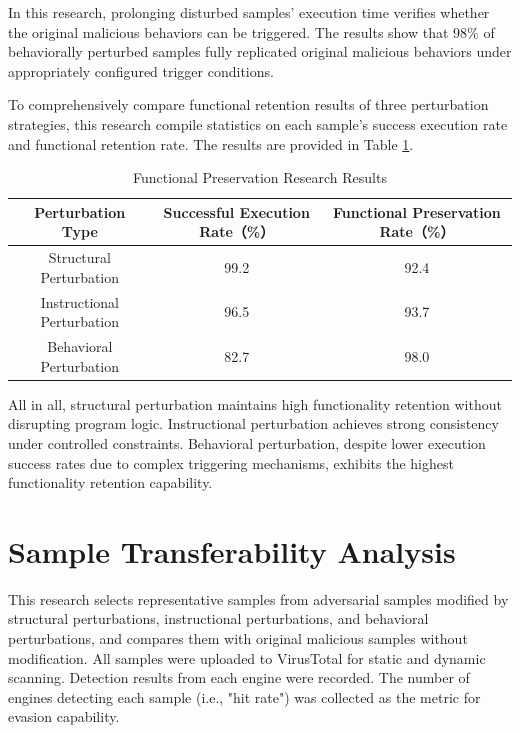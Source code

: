 In this research, prolonging disturbed samples' execution time verifies whether the original malicious behaviors can be triggered. The results show that 98\% of behaviorally perturbed samples fully replicated original malicious behaviors under appropriately configured trigger conditions.

To comprehensively compare functional retention results of three perturbation strategies, this research compile statistics on each sample's success execution rate and functional retention rate. The results are provided in Table \ref{tab:5.12}.

\begin{table}[htb]
	\centering
	\caption{Functional Preservation Research Results}
	\label{tab:5.12}
	\begin{tabular*}{0.9\textwidth}{@{\extracolsep{\fill}}ccc}
		\toprule
		Perturbation Type & Successful Execution Rate（\%） & Functional Preservation Rate（\%） \\
		\midrule
		Structural Perturbation & 99.2 & 92.4 \\
		Instructional Perturbation & 96.5 & 93.7 \\
		Behavioral Perturbation & 82.7 & 98.0 \\
		\bottomrule
	\end{tabular*}
\end{table}

All in all, structural perturbation maintains high functionality retention without disrupting program logic. Instructional perturbation achieves strong consistency under controlled constraints. Behavioral perturbation, despite lower execution success rates due to complex triggering mechanisms, exhibits the highest functionality retention capability.

\section{Sample Transferability Analysis}

This research selects representative samples from adversarial samples modified by structural perturbations, instructional perturbations, and behavioral perturbations, and compares them with original malicious samples without modification. All samples were uploaded to VirusTotal for static and dynamic scanning. Detection results from each engine were recorded. The number of engines detecting each sample (i.e., "hit rate") was collected as the metric for evasion capability.

